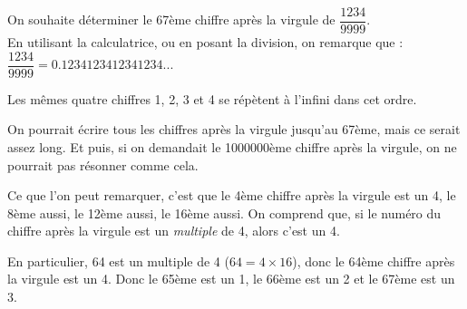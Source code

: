 \documentclass[../Cours.tex]{subfiles}
\begin{document}
\begin{questions}
\begin{center}
        \end{center}
    \question 
        \begin{center}
        \end{center}

     On souhaite déterminer le 67ème chiffre après la virgule de $\dfrac{1234}{9999}$.\\

    En utilisant la calculatrice, ou en posant la division, on remarque que :
    $\dfrac{1234}{9999} = \num{0,1234123412341234}...$

    Les mêmes quatre chiffres 1, 2, 3 et 4 se répètent à l'infini dans cet ordre.

    On pourrait écrire tous les chiffres après la virgule jusqu'au 67ème, mais ce serait assez long. Et puis, si on demandait le \num{1000000}ème chiffre après la virgule, on ne pourrait pas résonner comme cela.

    Ce que l'on peut remarquer, c'est que le 4ème chiffre après la virgule est un 4, le 8ème aussi, le 12ème aussi, le 16ème aussi. On comprend que, si le numéro du chiffre après la virgule est un \emph{multiple} de 4, alors c'est un 4.

    En particulier, 64 est un multiple de 4 ($64 = 4 \times 16$), donc le 64ème chiffre après la virgule est un 4. Donc le 65ème est un 1, le 66ème est un 2 et le 67ème est un 3.
\end{questions}
\clearpage
\pagestyle{plain}
\end{document}
